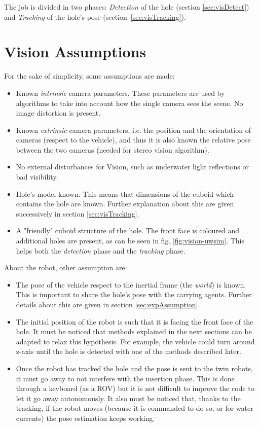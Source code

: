 \noindent The job is divided in two phases: \textit{Detection}  of the hole (section \ref{sec:visDetect}) and \textit{Tracking} of the hole's pose \mbox{(section \ref{sec:visTracking}).} 

\section{Vision Assumptions}
\label{sec:visioAssumption} %
For the sake of simplicity, some assumptions are made:
\begin{itemize}
	\item Known \textit{intrinsic} camera parameters. These parameters are used by algorithms to take into account how the single camera sees the scene. No image distortion is present.
	\item Known \textit{extrinsic} camera parameters, i.e. the position and the orientation of cameras (respect to the vehicle), and thus it is also known the relative pose between the two cameras (needed for stereo vision algorithm).
	\item No external disturbances for Vision, such as underwater light reflections or bad visibility.
	\item Hole's model known. This means that dimensions of the cuboid which contains the hole are known. Further explanation about this are given successively in section \ref{sec:visTracking}.
	\item A "friendly" cuboid structure of the hole. The front face is coloured and additional holes are present, as can be seen in fig. \ref{fig:vision-uwsim}. This helps both the \textit{detection} phase and the \textit{tracking} phase.
\end{itemize}
About the robot, other assumption are:
\begin{itemize}
	\item The pose of the vehicle respect to the inertial frame (the \textit{world}) is known. This is important to share the hole's pose with the carrying agents. Further details about this are given in section \ref{sec:expAssumption}.
	
	\item The initial position of the robot is such that it is facing the front face of the hole. It must be noticed that methods explained in the next sections can be adapted to relax this hypothesis. For example, the vehicle could turn around z-axis until the hole is detected with one of the methods described later. 
	
	\item Once the robot has tracked the hole and the pose is sent to the twin robots, it must go away to not interfere with the insertion phase. This is done through a keyboard (as a ROV) but it is not difficult to improve the code to let it go away autonomously. It also must be noticed that, thanks to the tracking, if the robot moves (because it is commanded to do so, or for water currents) the pose estimation keeps working. 
\end{itemize}


